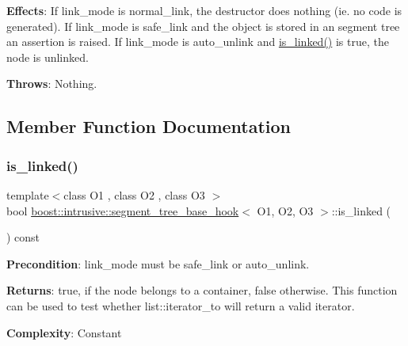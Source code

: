 {\bfseries Effects}\+: If link\+\_\+mode is {\ttfamily normal\+\_\+link}, the destructor does nothing (ie. no code is generated). If link\+\_\+mode is {\ttfamily safe\+\_\+link} and the object is stored in an segment tree an assertion is raised. If link\+\_\+mode is {\ttfamily auto\+\_\+unlink} and {\ttfamily \hyperlink{classboost_1_1intrusive_1_1segment__tree__base__hook_aacea6fce2437d1e3a30219fe4292bbb5}{is\+\_\+linked()}} is true, the node is unlinked.

{\bfseries Throws}\+: Nothing. 

\subsection{Member Function Documentation}
\mbox{\label{classboost_1_1intrusive_1_1segment__tree__base__hook_aacea6fce2437d1e3a30219fe4292bbb5}} 
\subsubsection{\texorpdfstring{is\+\_\+linked()}{is\_linked()}}
{\footnotesize\ttfamily template$<$class O1 , class O2 , class O3 $>$ \\
bool \hyperlink{classboost_1_1intrusive_1_1segment__tree__base__hook}{boost\+::intrusive\+::segment\+\_\+tree\+\_\+base\+\_\+hook}$<$ O1, O2, O3 $>$\+::is\+\_\+linked (\begin{DoxyParamCaption}{ }\end{DoxyParamCaption}) const}

{\bfseries Precondition}\+: link\+\_\+mode must be {\ttfamily safe\+\_\+link} or {\ttfamily auto\+\_\+unlink}.

{\bfseries Returns}\+: true, if the node belongs to a container, false otherwise. This function can be used to test whether {\ttfamily list\+::iterator\+\_\+to} will return a valid iterator.

{\bfseries Complexity}\+: Constant \mbox{\label{classboost_1_1intrusive_1_1segment__tree__base__hook_af7ba30a6fe62f2870197836df44f1ff9}} 

